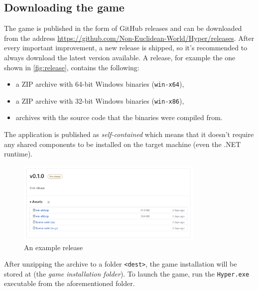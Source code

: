 \subsection{Downloading the game}
The game is published in the form of GitHub releases and can be downloaded from the address \url{https://github.com/Non-Euclidean-World/Hyper/releases}.
After every important improvement, a new release is shipped, so it's recommended to always download the latest version available.
A release, for example the one shown in \autoref{fig:release}, contains the following:
\begin{itemize}
    \item a ZIP archive with 64-bit Windows binaries (\texttt{win-x64}),
    \item a ZIP archive with 32-bit Windows binaries (\texttt{win-x86}),
    \item archives with the source code that the binaries were compiled from.
\end{itemize}

The application is published as \textit{self-contained} which means that it doesn't require any shared components to be installed on the target machine (even the .NET runtime).

\begin{figure}[H]
    \centering
    \includegraphics[width=0.8\textwidth]{sections/installation_instruction/resources/release-download.png}
    \caption{An example release}
    \label{fig:release}
\end{figure}

After unzipping the archive to a folder \texttt{<dest>}, the game installation will be stored at  (the \textit{game installation folder}).
To launch the game, run the \texttt{Hyper.exe} executable from the aforementioned folder.